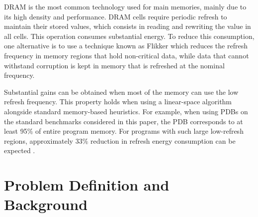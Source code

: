 \documentclass[letterpaper]{article}
\begin{document}
DRAM is the most common technology used for main memories, mainly due to its high density and performance. DRAM cells require periodic refresh to maintain their stored values, which consists in reading and rewriting the value in all cells. This operation consumes substantial energy. To reduce this consumption, one alternative is to use a technique known as Flikker \cite{Liu:2011:FSD:1950365.1950391} which reduces the refresh frequency in memory regions that hold non-critical data, %
while data that cannot withstand corruption is kept in memory that is refreshed at the nominal frequency. %

Substantial gains can be obtained when most of the memory can use the low refresh frequency. This property holds when using a linear-space algorithm alongside standard memory-based heuristics. For example, when using PDBs on the standard benchmarks considered in this paper, the PDB corresponds to at least 95\% of entire program memory. For programs with such large low-refresh regions, approximately 33\% reduction in refresh energy consumption can be expected \cite{Liu:2011:FSD:1950365.1950391}. 


\section{Problem Definition and Background}


\end{document}
